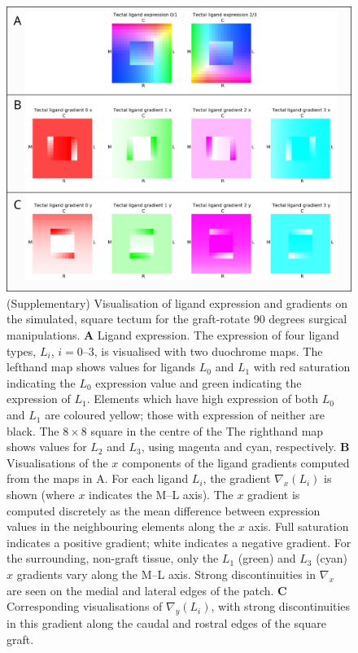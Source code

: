 \documentclass[9pt]{elife} %
\begin{document}

\begin{figure}
\begin{fullwidth}
\includegraphics[width=0.95\linewidth]{./images/Tissuevisb.png}
\caption{(Supplementary) Visualisation of ligand expression and gradients on the simulated, square tectum for the
graft-rotate 90 degrees surgical manipulations.
\textbf{A} Ligand expression.
The expression of four ligand types, $L_i$,  $i = 0$--$3$, is visualised with two duochrome maps.
The lefthand map shows values for ligands $L_0$ and $L_1$ with red saturation indicating the $L_0$ expression value and green indicating the expression of $L_1$.
Elements which have high expression of both $L_0$ and $L_1$ are coloured yellow; those with expression of neither are black. The $8\times8$ square in the centre of the
The righthand map shows values for $L_2$ and $L_3$, using magenta and cyan, respectively.
\textbf{B} Visualisations of the $x$ components of the ligand gradients computed from the maps in A.
For each ligand $L_i$, the gradient $\nabla_x(L_i)$ is shown (where $x$ indicates the M--L axis).
The $x$ gradient is computed discretely as the mean difference between expression values in the neighbouring elements along the $x$ axis.
Full saturation indicates a positive gradient; white indicates a negative gradient.
For the surrounding, non-graft tissue, only the $L_1$ (green) and $L_3$ (cyan) $x$ gradients vary along the M--L axis.
Strong discontinuities in $\nabla_x$ are seen on the medial and lateral edges of the patch.
\textbf{C} Corresponding visualisations of $\nabla_y(L_i)$, with strong discontinuities in this gradient along the caudal and rostral edges of the square graft.}
\label{f:trot90}
\end{fullwidth}
\end{figure}
\end{document}
